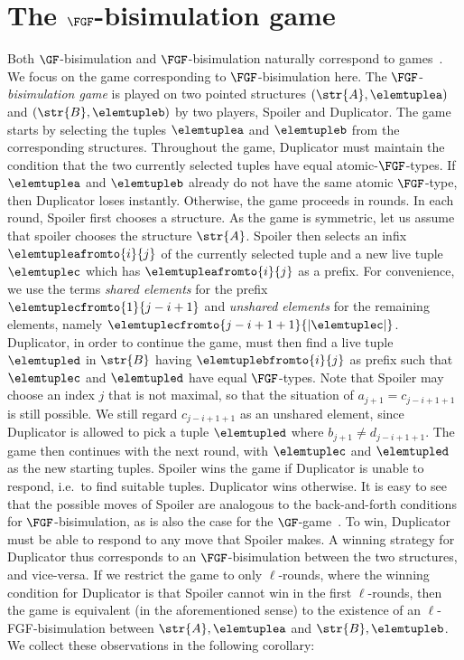 \section{The $\FGF$-bisimulation game}
Both $\GF$-bisimulation and $\FGF$-bisimulation naturally correspond to games~\cite[Sec. 1.2.1]{Gradel014}.
We focus on the game corresponding to $\FGF$-bisimulation here.
The $\FGF$-\emph{bisimulation game} is played on two pointed structures $(\str{A}, \elemtuplea)$ and $(\str{B}, \elemtupleb)$ by two players, Spoiler and Duplicator.
The game starts by selecting the tuples $\elemtuplea$ and $\elemtupleb$ from the corresponding structures.
Throughout the game, Duplicator must maintain the condition that the two currently selected tuples have equal atomic-$\FGF$-types.
If $\elemtuplea$ and $\elemtupleb$ already do not have the same atomic $\FGF$-type, then Duplicator loses instantly.
Otherwise, the game proceeds in rounds.
In each round, Spoiler first chooses a structure.
As the game is symmetric, let us assume that spoiler chooses the structure $\str{A}$.
Spoiler then selects an infix $\elemtupleafromto{i}{j}$ of the currently selected tuple and a new live tuple $\elemtuplec$ which has $\elemtupleafromto{i}{j}$ as a prefix.
For convenience, we use the terms \emph{shared elements} for the prefix $\elemtuplecfromto{1}{j-i+1}$ and \emph{unshared elements} for the remaining elements, namely $\elemtuplecfromto{j-i+1+1}{|\elemtuplec|}$.
Duplicator, in order to continue the game, must then find a live tuple $\elemtupled$ in $\str{B}$ having $\elemtuplebfromto{i}{j}$ as prefix such that $\elemtuplec$ and $\elemtupled$ have equal $\FGF$-types.
Note that Spoiler may choose an index $j$ that is not maximal, so that the situation of $a_{j+1} = c_{j-i+1+1}$ is still possible.
We still regard $c_{j-i+1+1}$ as an unshared element, since Duplicator is allowed to pick a tuple $\elemtupled$ where $b_{j+1} \neq d_{j-i+1+1}$.
The game then continues with the next round, with $\elemtuplec$ and $\elemtupled$ as the new starting tuples.
Spoiler wins the game if Duplicator is unable to respond, i.e.\ to find suitable tuples.
Duplicator wins otherwise.
It is easy to see that the possible moves of Spoiler are analogous to the back-and-forth conditions for $\FGF$-bisimulation, as is also the case for the $\GF$-game~\cite[Sec.\ 1.3.2]{Gradel014}.
To win, Duplicator must be able to respond to any move that Spoiler makes.
A winning strategy for Duplicator thus corresponds to an $\FGF$-bisimulation between the two structures, and vice-versa.
If we restrict the game to only $\ell$-rounds, where the winning condition for Duplicator is that Spoiler cannot win in the first $\ell$-rounds, then the game is equivalent (in the aforementioned sense) to the existence of an $\ell$-FGF-bisimulation between $\str{A}, \elemtuplea$ and $\str{B}, \elemtupleb$.
We collect these observations in the following corollary:

